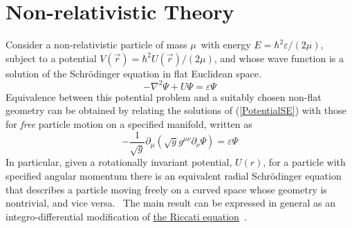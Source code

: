 \documentclass{article}%
\begin{document}
\section{Non-relativistic Theory}

Consider a non-relativistic particle of mass $\mu$\ with energy $E=\hbar
^{2}\varepsilon/\left(  2\mu\right)  $, subject to a potential $V\left(
\overrightarrow{r}\right)  =\hbar^{2}U\left(  \overrightarrow{r}\right)
/\left(  2\mu\right)  $, and whose wave function is a solution of the
Schr\"{o}dinger equation in flat Euclidean space.
\begin{equation}
-\nabla^{2}\Psi+U\Psi=\varepsilon\Psi\label{PotentialSE}%
\end{equation}
Equivalence between this potential problem and a suitably chosen non-flat
geometry can be obtained by relating the solutions of (\ref{PotentialSE}) with
those for \emph{free} particle motion on a specified manifold, written as
\begin{equation}
-\frac{1}{\sqrt{g}}\partial_{\mu}\left(  \sqrt{g}g^{\mu\nu}\partial_{\nu}%
\Psi\right)  =\varepsilon\Psi\label{GeometricSE}%
\end{equation}
In particular, given a rotationally invariant potential, $U\left(  r\right)
$, for a particle with specified angular momentum there is an equivalent
radial Schr\"{o}dinger equation that describes a particle moving freely on a
curved space whose geometry is nontrivial, and vice versa. \ The main result
can be expressed in general as an integro-differential modification of
\href{https://en.wikipedia.org/wiki/Riccati_equation}{the Riccati
equation}\ \cite{Ince}.
\end{document}

